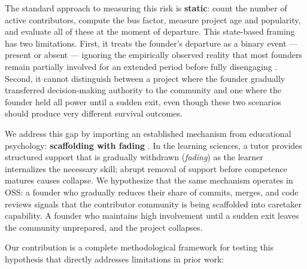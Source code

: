 \documentclass[11pt,letterpaper]{article}
\begin{document}
The standard approach to measuring this risk is \textbf{static}: count the number of active contributors, compute the bus factor, measure project age and popularity, and evaluate all of these at the moment of departure. This state-based framing has two limitations. First, it treats the founder's departure as a binary event --- present or absent --- ignoring the empirically observed reality that most founders remain partially involved for an extended period before fully disengaging \citep{Avelino2019}. Second, it cannot distinguish between a project where the founder gradually transferred decision-making authority to the community and one where the founder held all power until a sudden exit, even though these two scenarios should produce very different survival outcomes.

We address this gap by importing an established mechanism from educational psychology: \textbf{scaffolding with fading} \citep{Wood1976,Baker2017}. In the learning sciences, a tutor provides structured support that is gradually withdrawn (\textit{fading}) as the learner internalizes the necessary skill; abrupt removal of support before competence matures causes collapse. We hypothesize that the same mechanism operates in OSS: a founder who gradually reduces their share of commits, merges, and code reviews signals that the contributor community is being scaffolded into caretaker capability. A founder who maintains high involvement until a sudden exit leaves the community unprepared, and the project collapses.

Our contribution is a complete methodological framework for testing this hypothesis that directly addresses limitations in prior work:
\end{document}
